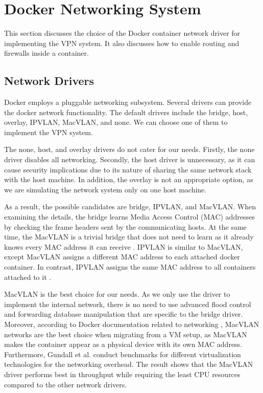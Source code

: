 \documentclass[article]{aaltoseries}
\begin{document}


\section{Docker Networking System}
This section discusses the choice of the Docker container network driver for implementing the VPN system. It also discusses how to enable routing and firewalls inside a container.

\subsection{Network Drivers}
Docker employs a pluggable networking subsystem. Several drivers can provide the docker network functionality. The default drivers include the bridge, host, overlay, IPVLAN, MacVLAN, and none. We can choose one of them to implement the VPN system.

The none, host, and overlay drivers do not cater for our needs. Firstly, the none driver disables all networking. Secondly, the host driver is unnecessary, as it can cause security implications due to its nature of sharing the same network stack with the host machine. In addition, the overlay is not an appropriate option, as we are simulating the network system only on one host machine.

As a result, the possible candidates are bridge, IPVLAN, and MacVLAN. When examining the details, the bridge learns Media Access Control (MAC) addresses by checking the frame headers sent by the communicating hosts. At the same time, the MacVLAN is a trivial bridge that does not need to learn as it already knows every MAC address it can receive \cite{9620212}. IPVLAN is similar to MacVLAN, except MacVLAN assigns a different MAC address to each attached docker container. In contrast, IPVLAN assigns the same MAC address to all containers attached to it \cite{7502883}.

MacVLAN is the best choice for our needs. As we only use the driver to implement the internal network, there is no need to use advanced flood control and forwarding database manipulation that are specific to the bridge driver. Moreover, according to Docker documentation related to networking \cite{docker_documentation_2023}, MacVLAN networks are the best choice when migrating from a VM setup, as MacVLAN makes the container appear as a physical device with its own MAC address. Furthermore, Gundall et al. \cite{9442123} conduct benchmarks for different virtualization technologies for the networking overhead. The result shows that the MacVLAN driver performs best in throughput while requiring the least CPU resources compared to the other network drivers.
\end{document}
